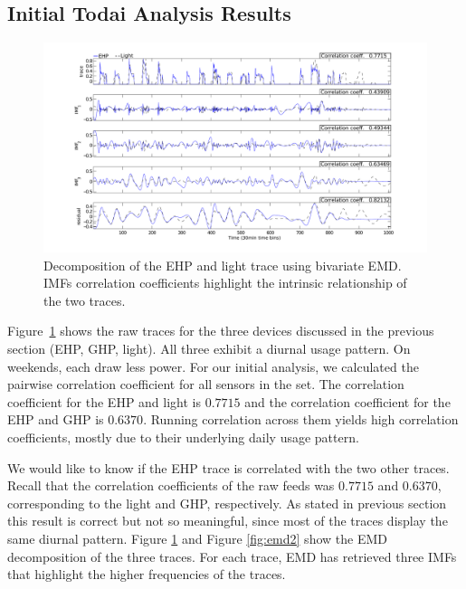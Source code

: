 \subsection{Initial Todai Analysis Results}


\begin{figure}[th!]
\hspace{-2cm}
\includegraphics[width=1.2\textwidth]{figs/emd_25_26-eps-converted-to}
\vspace{-1cm}
\caption{Decomposition of the EHP and light trace using bivariate EMD. IMFs correlation coefficients highlight the intrinsic relationship of the two traces.}
\label{fig:emd}
\end{figure}

Figure~\ref{fig:emd} shows the raw traces for the three devices discussed in 
the previous section (EHP, GHP, light). All three exhibit a diurnal usage pattern.  On weekends, each
draw less power.   For our initial analysis, we calculated the pairwise 
correlation coefficient for all sensors in the set.  The correlation coefficient for 
 the EHP and light is $0.7715$ and the correlation coefficient for the EHP and GHP is $0.6370$.
Running correlation across them yields high correlation coefficients, mostly
due to their underlying daily usage pattern.

We would like to know if the EHP trace is correlated with the two other traces.
Recall that the correlation coefficients of the raw feeds was $0.7715$ and $0.6370$, corresponding to the light 
and GHP, respectively.
As stated in previous section this result is correct but not so meaningful, since most of the traces
display the same diurnal pattern.
Figure \ref{fig:emd} and Figure \ref{fig:emd2} show the EMD decomposition of the three traces.
For each trace, EMD has retrieved three IMFs that highlight the higher frequencies of the traces.


